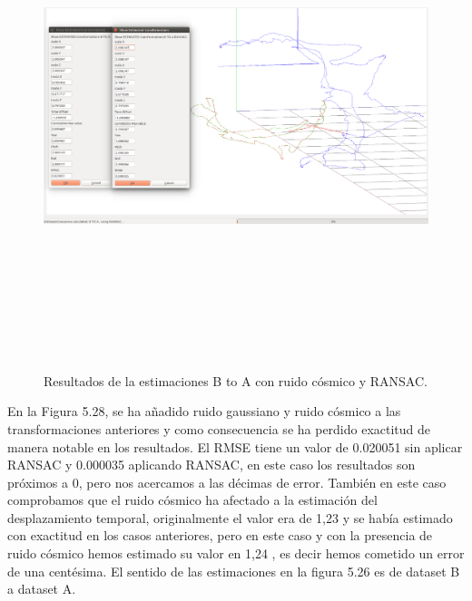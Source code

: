 \begin{figure}[H]
\begin{center}
\label{fig:opciones de View}\includegraphics[height=14.0cm,width=18.0cm]{img/cap6/newData_EscalaTraslaRotaGaussCosmic_ba.png}
\hspace{0.5cm}
\end{center}

\caption{Resultados de la estimaciones B to A con ruido cósmico y RANSAC.}
\end{figure}
En la Figura 5.28, se ha añadido ruido gaussiano y ruido cósmico a las transformaciones anteriores y como consecuencia se ha perdido exactitud de manera notable en los resultados. 
El RMSE tiene un valor de 0.020051 sin aplicar RANSAC y 0.000035 aplicando RANSAC, en este caso los resultados son próximos a 0, pero nos acercamos a las décimas de error.
También en este caso comprobamos que el ruido cósmico ha afectado a la estimación del desplazamiento temporal, originalmente el valor era de 1,23 y se había estimado con exactitud en los casos anteriores, pero en este caso y con la presencia de ruido cósmico hemos estimado su valor en 1,24 , es decir hemos cometido un error de una centésima.
El sentido de las estimaciones en la figura 5.26 es de dataset B a dataset A.


